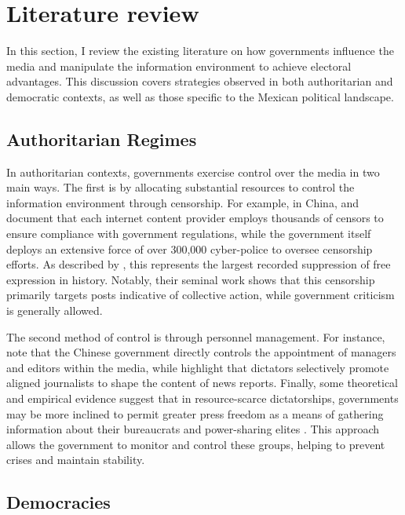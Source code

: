 \section{Literature review}
\label{sec:lit_review}

In this section, I review the existing literature on how governments influence the media and manipulate the information environment to achieve electoral advantages. This discussion covers strategies observed in both authoritarian and democratic contexts, as well as those specific to the Mexican political landscape.

\subsection{Authoritarian Regimes}

In authoritarian contexts, governments exercise control over the media in two main ways. The first is by allocating substantial resources to control the information environment through censorship. For example, in China, \cite{Army-Chen-Book} and \citep{CensorshipCollective-King-APSR} document that each internet content provider employs thousands of censors to ensure compliance with government regulations, while the government itself deploys an extensive force of over 300,000 cyber-police to oversee censorship efforts. As described by \cite{CensorshipChina-King-Science}, this represents the largest recorded suppression of free expression in history. Notably, their seminal work shows that this censorship primarily targets posts indicative of collective action, while government criticism is generally allowed.

The second method of control is through personnel management. For instance, \cite{Plus-Anne-PostComm} note that the Chinese government directly controls the appointment of managers and editors within the media, while \cite{PersonnelMedia-Lee-IntJPPoli} highlight that dictators selectively promote aligned journalists to shape the content of news reports. Finally, some theoretical and empirical evidence suggest that in resource-scarce dictatorships, governments may be more inclined to permit greater press freedom as a means of gathering information about their bureaucrats \citep{PoorDict-Guriev-APSR} and power-sharing elites \citep{ElitesMedia-Tung-PolComm}. This approach allows the government to monitor and control these groups, helping to prevent crises and maintain stability.

\subsection{Democracies}

